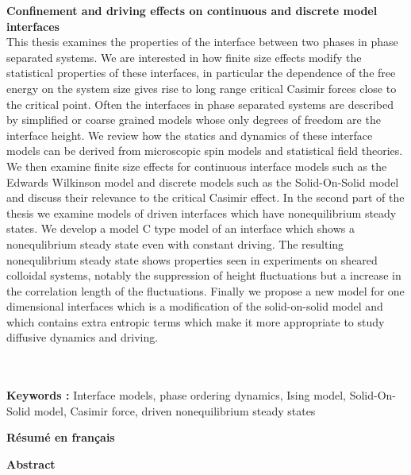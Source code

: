 {\bf Confinement and driving effects on continuous and discrete model interfaces}\\
This thesis examines the properties  of the interface between two phases in  phase separated systems. We are interested 
in how finite size effects modify the statistical properties of these interfaces, in particular  the dependence of the free energy on the system size 
gives rise to long range critical Casimir forces close to the critical point. Often the interfaces in phase separated systems are
described by simplified or coarse grained models whose only degrees of freedom are the interface height. We review how the statics and dynamics of
these  interface models can be derived from microscopic spin models and statistical field theories. We then examine finite size effects for 
continuous interface models such as the Edwards Wilkinson model and discrete models such as the Solid-On-Solid model  and discuss their 
relevance to the critical Casimir effect. In the second part of the thesis we examine models of driven interfaces which have nonequilibrium steady states. 
We develop a model C type model of an interface which shows a nonequlibrium steady
state even with constant driving. The resulting nonequlibrium steady state shows properties seen in experiments on sheared colloidal systems,
notably the suppression of height fluctuations but   a increase in the  correlation length of the fluctuations. Finally we propose a new model for
one dimensional interfaces which is a modification of  the solid-on-solid model and which contains extra entropic terms which make it more
appropriate to study diffusive dynamics and driving.

\\ \\
{\bf Keywords : }  Interface models, phase ordering dynamics, Ising model, Solid-On-Solid model, Casimir force, driven nonequilibrium steady states

\cleardoublepage
{\bf \huge Résumé en français}
\cleardoublepage



{\bf \huge Abstract}
